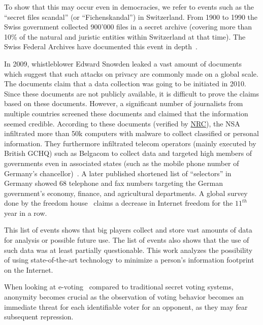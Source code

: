 To show that this may occur even in democracies, we refer to events such as the ``secret files scandal'' (or  ``Fichenskandal'') in Switzerland. From 1900 to 1990 the Swiss government collected 900’000 files in a secret archive (covering more than 10\% of the natural and juristic entities within Switzerland at that time). The Swiss Federal Archives have documented this event in depth~\cite{Leuenberger1989}.

In 2009, whistleblower Edward Snowden leaked a vast amount of documents which suggest that such attacks on privacy are commonly made on a global scale. The documents claim that a data collection was going to be initiated in 2010. Since these documents are not publicly available, it is difficult to prove the claims based on these documents. However, a significant number of journalists from multiple countries screened these documents and claimed that the information seemed credible. According to these documents (verified by \href{http://www.nrc.nl/nieuws/2013/11/23/nederland-sinds-1946-doelwit-van-nsa}{NRC}), the NSA infiltrated more than 50k computers with malware to collect classified or personal information. They furthermore infiltrated telecom operators (mainly executed by British GCHQ) such as Belgacom to collect data and targeted high members of governments even in associated states (such as the mobile phone number of Germany's chancellor)~\cite{NCR2013,XKeyscore,Ball2013,Ackerman2013,Greenberg2013}. A later published shortened list of ``selectors'' in Germany showed 68 telephone and fax numbers targeting the German government's economy, finance, and agricultural departments. A global survey done by the freedom house~\cite{FOTN2020} claims a decrease in Internet freedom for the $\text{11}^{th}$ year in a row.

This list of events shows that big players collect and store vast amounts of data for analysis or possible future use. The list of events also shows that the use of such data was at least partially questionable. This work analyzes the possibility of using state-of-the-art technology to minimize a person's information footprint on the Internet. 

When looking at e-voting~\cite{haenni2008research} compared to traditional secret voting systems, anonymity becomes crucial as the observation of voting behavior becomes an immediate threat for each identifiable voter for an opponent, as they may fear subsequent repression.

